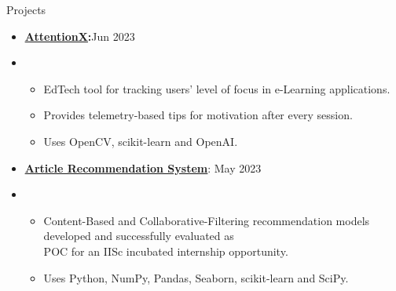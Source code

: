 \documentclass{resume}
\begin{document}
\begin{rSection}{Projects}
\begin{itemize}[label=\null, leftmargin=*, parsep=0.5em]
            \item {
                  \textbf{\href{https://github.com/AdwayB/AttentionX}{ \underline{AttentionX}}:}\hfill Jun 2023
                  } \\
            \item {
                  \vspace{-1.2\baselineskip}
                  \begin{itemize}[label=$\bullet$]
                        \vspace{-\parskip}
                        \vspace{-\parsep}
                        \item {
                              EdTech tool for tracking users' level of focus in e-Learning applications.
                              }
                        \item {
                              Provides telemetry-based tips for motivation after every session.
                              }
                        \item {
                              Uses OpenCV, scikit-learn and OpenAI.\@
                              }
                  \end{itemize}
                  }



            \item {
                  \textbf{\href{https://github.com/AdwayB/aiaceszt-Article-Recommendation}{\underline{Article Recommendation System}}}: \hfill May 2023
                  } \\
            \item {
                  \vspace{-1.2\baselineskip}
                  \begin{itemize}[label=$\bullet$]
                        \vspace{-\parskip}
                        \vspace{-\parsep}
                        \item {
                              Content-Based and Collaborative-Filtering recommendation models developed and successfully evaluated as \\
                              POC for an IISc incubated internship opportunity.
                              }
                        \item {
                              Uses Python, NumPy, Pandas, Seaborn, scikit-learn and SciPy.
                              }
                  \end{itemize}
                  }
      \end{itemize}
\end{rSection}
\end{document}

